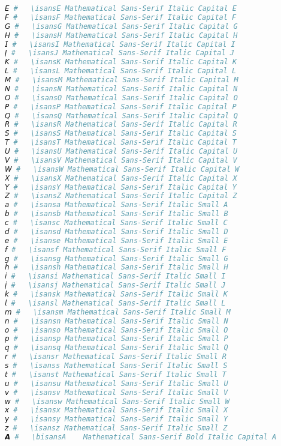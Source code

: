 \begin{lstlisting}[language=Julia]
𝘌 #   \isansE Mathematical Sans-Serif Italic Capital E
𝘍 #   \isansF Mathematical Sans-Serif Italic Capital F
𝘎 #   \isansG Mathematical Sans-Serif Italic Capital G
𝘏 #   \isansH Mathematical Sans-Serif Italic Capital H
𝘐 #   \isansI Mathematical Sans-Serif Italic Capital I
𝘑 #   \isansJ Mathematical Sans-Serif Italic Capital J
𝘒 #   \isansK Mathematical Sans-Serif Italic Capital K
𝘓 #   \isansL Mathematical Sans-Serif Italic Capital L
𝘔 #   \isansM Mathematical Sans-Serif Italic Capital M
𝘕 #   \isansN Mathematical Sans-Serif Italic Capital N
𝘖 #   \isansO Mathematical Sans-Serif Italic Capital O
𝘗 #   \isansP Mathematical Sans-Serif Italic Capital P
𝘘 #   \isansQ Mathematical Sans-Serif Italic Capital Q
𝘙 #   \isansR Mathematical Sans-Serif Italic Capital R
𝘚 #   \isansS Mathematical Sans-Serif Italic Capital S
𝘛 #   \isansT Mathematical Sans-Serif Italic Capital T
𝘜 #   \isansU Mathematical Sans-Serif Italic Capital U
𝘝 #   \isansV Mathematical Sans-Serif Italic Capital V
𝘞 #   \isansW Mathematical Sans-Serif Italic Capital W
𝘟 #   \isansX Mathematical Sans-Serif Italic Capital X
𝘠 #   \isansY Mathematical Sans-Serif Italic Capital Y
𝘡 #   \isansZ Mathematical Sans-Serif Italic Capital Z
𝘢 #   \isansa Mathematical Sans-Serif Italic Small A
𝘣 #   \isansb Mathematical Sans-Serif Italic Small B
𝘤 #   \isansc Mathematical Sans-Serif Italic Small C
𝘥 #   \isansd Mathematical Sans-Serif Italic Small D
𝘦 #   \isanse Mathematical Sans-Serif Italic Small E
𝘧 #   \isansf Mathematical Sans-Serif Italic Small F
𝘨 #   \isansg Mathematical Sans-Serif Italic Small G
𝘩 #   \isansh Mathematical Sans-Serif Italic Small H
𝘪 #   \isansi Mathematical Sans-Serif Italic Small I
𝘫 #   \isansj Mathematical Sans-Serif Italic Small J
𝘬 #   \isansk Mathematical Sans-Serif Italic Small K
𝘭 #   \isansl Mathematical Sans-Serif Italic Small L
𝘮 #   \isansm Mathematical Sans-Serif Italic Small M
𝘯 #   \isansn Mathematical Sans-Serif Italic Small N
𝘰 #   \isanso Mathematical Sans-Serif Italic Small O
𝘱 #   \isansp Mathematical Sans-Serif Italic Small P
𝘲 #   \isansq Mathematical Sans-Serif Italic Small Q
𝘳 #   \isansr Mathematical Sans-Serif Italic Small R
𝘴 #   \isanss Mathematical Sans-Serif Italic Small S
𝘵 #   \isanst Mathematical Sans-Serif Italic Small T
𝘶 #   \isansu Mathematical Sans-Serif Italic Small U
𝘷 #   \isansv Mathematical Sans-Serif Italic Small V
𝘸 #   \isansw Mathematical Sans-Serif Italic Small W
𝘹 #   \isansx Mathematical Sans-Serif Italic Small X
𝘺 #   \isansy Mathematical Sans-Serif Italic Small Y
𝘻 #   \isansz Mathematical Sans-Serif Italic Small Z
𝘼 #   \bisansA    Mathematical Sans-Serif Bold Italic Capital A

\end{lstlisting}
